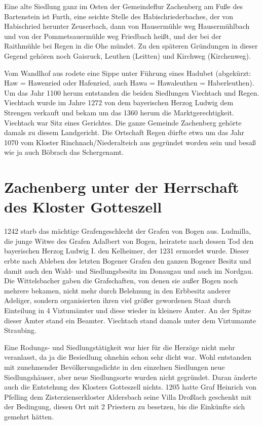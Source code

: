 \documentclass[12pt,a4pager]{book}
\begin{document}
Eine alte Siedlung ganz im Osten der Gemeindeflur Zachenberg am Fuße des
Bartenstein ist Furth, eine seichte Stelle des Habischriederbaches, der von
Habischried herunter Zeuserbach, dann von Hausermühle weg Hausermühlbach und von
der Pommetsauermühle weg Friedbach heißt, und der bei der Raithmühle bei Regen
in die Ohe mündet. Zu den späteren Gründungen in dieser Gegend gehören noch
Gaisruck, Leuthen (Leitten) und Kirchweg (Kirchenweg).

Vom Wandlhof aus rodete eine Sippe unter Führung eines Hadubet (abgekürzt: Haw =
Hawenried oder Hafenried, auch Hawa = Hawaleuthen = Haberleuthen). Um das Jahr
1100 herum entstanden die beiden Siedlungen Viechtach und Regen. Viechtach wurde
im Jahre 1272 von dem bayerischen Herzog Ludwig dem Strengen verkauft und bekam
um das 1360 herum die Marktgerechtigkeit. Viechtach war Sitz eines Gerichtes.
Die ganze Gemeinde Zachenberg gehörte damals zu diesem Landgericht. Die
Ortschaft Regen dürfte etwa um das Jahr 1070 vom Kloster Rinchnach/Niederalteich
aus gegründet worden sein und besaß wie ja auch Böbrach das Schergenamt.

\section{Zachenberg unter der Herrschaft des Kloster Gotteszell}

1242 starb das mächtige Grafengeschlecht der Grafen von Bogen aus. Ludmilla, die
junge Witwe des Grafen Adalbert von Bogen, heiratete nach dessen Tod den
bayerischen Herzog Ludwig I. den Kelheimer, der 1231 ermordet wurde. Dieser
erbte nach Ableben des letzten Bogener Grafen den ganzen Bogener Besitz und
damit auch den Wald- und Siedlungsbesitz im Donaugau und auch im Nordgau. Die
Wittelsbacher gaben die Grafschaften, von denen sie außer Bogen noch mehrere
bekamen, nicht mehr durch Belehnung in den Erbbesitz anderer Adeliger, sondern
organisierten ihren viel größer gewordenen Staat durch Einteilung in 4
Viztumämter und diese wieder in kleinere Ämter. An der Spitze dieser Ämter stand
ein Beamter. Viechtach stand damals unter dem Viztumamte Straubing.

Eine Rodungs- und Siedlungstätigkeit war hier für die Herzöge nicht mehr
veranlasst, da ja die Besiedlung ohnehin schon sehr dicht war. Wohl entstanden
mit zunehmender Bevölkerungsdichte in den einzelnen Siedlungen neue
Siedlungshäuser, aber neue Siedlungsorte wurden nicht gegründet. Daran änderte
auch die Entstehung des Klosters Gotteszell nichts. 1205 hatte Graf Heinrich von
Pfelling dem Zisterzienserkloster Aldersbach seine Villa Droßlach geschenkt mit
der Bedingung, diesen Ort mit 2 Priestern zu besetzen, bis die Einkünfte sich
gemehrt hätten.
\end{document}
